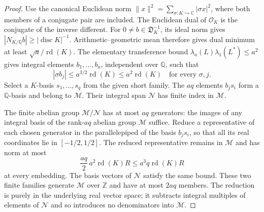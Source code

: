 \begin{proof}
Use the canonical Euclidean norm
$\|x\|^2=\sum_{\sigma:K\hookrightarrow\mathbb C}|\sigma x|^2$,
where both members of a conjugate pair are included.  The Euclidean
dual of $\mathcal O_K$ is the conjugate of the inverse different.
For $0\ne b\in\mathfrak D_K^{-1}$, its ideal norm gives
$|N_{K/\mathbb Q}b|\ge|\operatorname{disc}K|^{-1}$.
Arithmetic--geometric mean therefore gives dual minimum at least
$\sqrt a/\operatorname{rd}(K)$.
The elementary transference bound
$\lambda_a(L)\lambda_1(L^*)\le a^2$ gives integral elements
$b_1,\ldots,b_a$, independent over $\mathbb Q$, such that
\[
           |\sigma b_j|\le a^{3/2}\operatorname{rd}(K)
                         \le a^2\operatorname{rd}(K)
                      \quad\text{for every }\sigma,j.
\]
Select a $K$-basis $s_1,\ldots,s_q$ from the given short family.
The $aq$ elements $b_js_i$ form a $\mathbb Q$-basis and belong to
$\mathcal M$.  Their integral span $\mathcal N$ has finite index
in $\mathcal M$.

The finite abelian group $\mathcal M/\mathcal N$ has at most
$aq$ generators: the images of any integral basis of the rank-$aq$
abelian group $\mathcal M$ suffice.  Reduce a representative of
each chosen generator in the parallelepiped of the basis $b_js_i$,
so that all its real coordinates lie in $[-1/2,1/2]$.
The reduced representative remains in $\mathcal M$ and has norm
at most
\[
          \frac{aq}{2}\,a^2\operatorname{rd}(K)R
                          \le a^3q\operatorname{rd}(K)R
\]
at every embedding.  The basis vectors of $\mathcal N$ satisfy
the same bound.  These two finite families generate
$\mathcal M$ over $\mathbb Z$ and have at most $2aq$ members.
The reduction is purely in the underlying real vector space;
it subtracts integral multiples of elements of $\mathcal N$
and so introduces no denominators into $\mathcal M$.
\end{proof}


